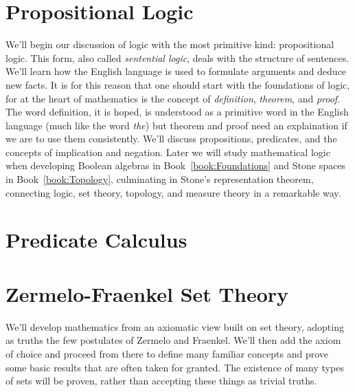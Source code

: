\begingroup
    \ifcsname\PATH\endcsname
        \newcommand{\PATH}{books/Foundations/Logic_and_Sets}
        \newcommand{\OLDPATH}{\PATH}
    \else
        \newcommand{\OLDPATH}{\PATH}
        \renewcommand{\PATH}{books/Foundations/Logic_and_Sets}
    \fi
    \chapter{Propositional Logic}
        \label{chapt:Propositional_Logic}%
        We'll begin our discussion of logic with the most primitive kind:
        propositional logic. This form, also called
        \textit{sentential logic}, deals with the
        structure of sentences. We'll learn how the English language is used to
        formulate arguments and deduce new facts. It is for this reason that one
        should start with the foundations of logic, for at the heart of
        mathematics is the concept of \textit{definition}, \textit{theorem}, and
        \textit{proof}. The word definition, it is hoped, is understood as a
        primitive word in the English language (much like the word \textit{the})
        but theorem and proof need an explaination if we are to use them
        consistently. We'll discuss propositions, predicates, and the concepts
        of implication and negation. Later we will study mathematical logic when
        developing Boolean algebras in
        Book~\ref{book:Foundations} and Stone spaces in
        Book~\ref{book:Topology}, culminating in Stone's representation
        theorem, connecting logic, set
        theory, topology, and measure theory in a remarkable way.
        
        
    \chapter{Predicate Calculus}
        \label{chapt:Predicate_Calculus}%
        
    \chapter{Zermelo-Fraenkel Set Theory}
        \label{chapt:Zermelo_Fraenkel_Set_Theory}%
        We'll develop mathematics from an axiomatic view built on set theory,
        adopting as truths the few postulates of Zermelo and Fraenkel. We'll
        then add the axiom of choice and proceed from there to define many
        familiar concepts and prove some basic results that are often taken for
        granted. The existence of many types of sets will be proven, rather than
        accepting these things as trivial truths.
        
        
        
